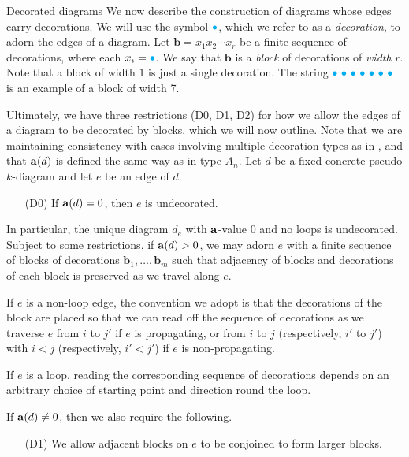 
\begin{section}{Decorated diagrams}\label{decorated}
We now describe the construction of diagrams whose edges carry decorations. We will use the symbol ${\color{cyan}\bullet}$, which we refer to as a \emph{decoration}, to adorn the edges of a diagram. Let $\mathbf{b}=x_{1}x_{2}\cdots x_{r}$ be a finite sequence of decorations, where each $x_i={\color{cyan}\bullet}$. We say that $\mathbf{b}$ is a \emph{block} of decorations of \emph{width} $r$.  Note that a block of width $1$ is just a single decoration.  The string ${\color{cyan}\bullet}~{\color{cyan}\bullet}~{\color{cyan}\bullet}~{\color{cyan}\bullet}~{\color{cyan}\bullet}~{\color{cyan}\bullet}~{\color{cyan}\bullet}$ is an example of a block of width 7.

Ultimately, we have three restrictions (D0, D1, D2) for how we allow the edges of a diagram to be decorated by blocks, which we will now outline. Note that we are maintaining consistency with cases involving multiple decoration types as in \cite{Ernst2012}, and that $\mathbf{a}(d)$ is defined the same way as in type $A_n$. Let $d$ be a fixed concrete pseudo $k$-diagram and let $e$ be an edge of $d$.

\begin{enumerate}[leftmargin=0.6in]

\item[(D0)] If $\mathbf{a}(d)=0$, then $e$ is undecorated.

\end{enumerate}

\noindent In particular, the unique diagram $d_{e}$ with $\mathbf{a}$-value 0 and no loops is undecorated.
Subject to some restrictions, if $\mathbf{a}(d)>0$, we may adorn $e$ with a finite sequence of blocks of decorations $\mathbf{b}_{1}, \dots, \mathbf{b}_{m}$ such that adjacency of blocks and decorations of each block is preserved as we travel along $e$.  

If $e$ is a non-loop edge, the convention we adopt is that the decorations of the block are placed so that we can read off the sequence of decorations as we traverse $e$ from $i$ to $j'$ if $e$ is propagating, or from $i$ to $j$ (respectively, $i'$ to $j'$) with $i < j$ (respectively, $i' < j'$) if $e$ is non-propagating.

If $e$ is a loop, reading the corresponding sequence of decorations depends on an arbitrary choice of starting point and direction round the loop.


If $\mathbf{a}(d)\neq 0$, then we also require the following.

\begin{enumerate}[leftmargin=0.6in]
\item[(D1)] We allow adjacent blocks on $e$ to be conjoined to form larger blocks.



\end{enumerate}
\end{section}
